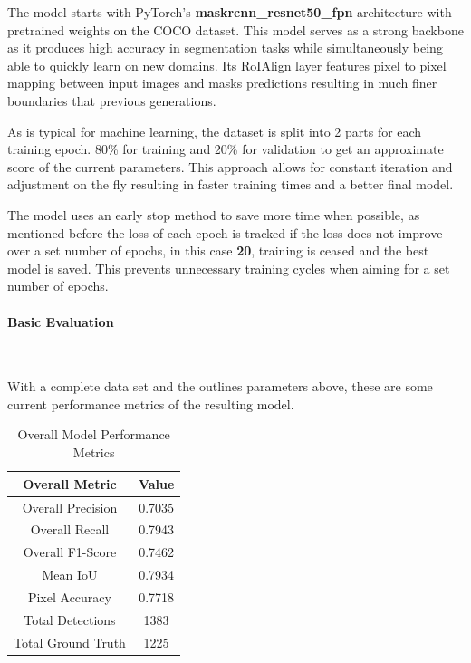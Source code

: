 \documentclass[final]{cmpreport_02}
\begin{document}
The model starts with PyTorch's \textbf{maskrcnn\_resnet50\_fpn} architecture with pretrained weights on the COCO \citep{coco} dataset.
This model serves as a strong backbone as it produces high accuracy in segmentation tasks while simultaneously being able to quickly learn on new domains.
Its RoIAlign layer features pixel to pixel mapping between input images and masks predictions resulting in much finer boundaries that previous generations.

As is typical for machine learning, the dataset is split into 2 parts for each training epoch. 80\% for training and 20\% for validation to get an approximate score of the current parameters.
This approach allows for constant iteration and adjustment on the fly resulting in faster training times and a better final model.

The model uses an early stop method to save more time when possible, as mentioned before the loss of each epoch is tracked if the loss does not improve over a set number of epochs, in this case \textbf{20}, training is ceased and the best model is saved.
This prevents unnecessary training cycles when aiming for a set number of epochs.


\paragraph{Basic Evaluation} \

With a complete data set and the outlines parameters above, these are some current performance metrics of the resulting model.

\begin{table}[H]
\centering
\begin{tabular}{c|c}
\hline
\textbf{Overall Metric} & \textbf{Value} \\
\hline
\hline
Overall Precision & 0.7035 \\
Overall Recall & 0.7943 \\
Overall F1-Score & 0.7462 \\
Mean IoU & 0.7934 \\
Pixel Accuracy & 0.7718 \\
Total Detections & 1383 \\
Total Ground Truth & 1225 \\
\hline
\end{tabular}
\caption{Overall Model Performance Metrics}
\label{tab:overall_metrics}
\end{table}
\end{document}
